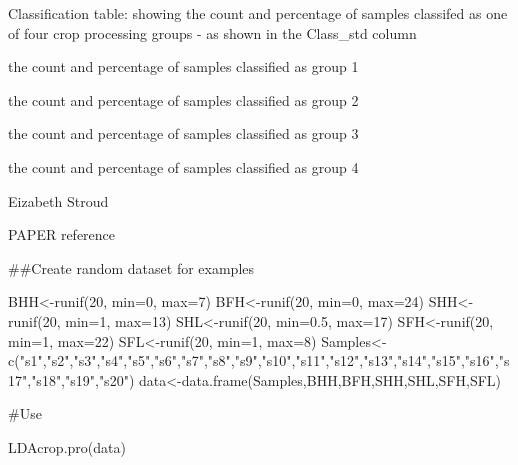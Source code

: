 \documentclass[a4paper]{book}
\begin{document}
\begin{Value}
\begin{ldescription}
\end{ldescription}
Classification table: showing the count and percentage of samples classifed as one of four crop processing groups - as shown in the Class\_std column
\begin{ldescription}
\item[\code{winnowing by-products}] the count and percentage of samples classified as group 1
\item[\code{Coarse-sieving by-products}] the count and percentage of samples classified as group 2
\item[\code{Fine-sieving by-products}] the count and percentage of samples classified as group 3
\item[\code{Fine-sieving products}] the count and percentage of samples classified as group 4
\end{ldescription}
\end{Value}
%
\begin{Author}\relax
Eizabeth Stroud

\end{Author}
%
\begin{References}\relax
PAPER reference

\end{References}
%
\begin{Examples}
\begin{ExampleCode}
##Create random dataset for examples

BHH<-runif(20, min=0, max=7)
BFH<-runif(20, min=0, max=24)
SHH<-runif(20, min=1, max=13)
SHL<-runif(20, min=0.5, max=17)
SFH<-runif(20, min=1, max=22)
SFL<-runif(20, min=1, max=8)
Samples<-c("s1","s2","s3","s4","s5","s6","s7","s8","s9","s10","s11","s12","s13","s14","s15","s16","s17","s18","s19","s20")
data<-data.frame(Samples,BHH,BFH,SHH,SHL,SFH,SFL)

#Use

LDAcrop.pro(data)

\end{ExampleCode}
\end{Examples}
\printindex{}
\end{document}
